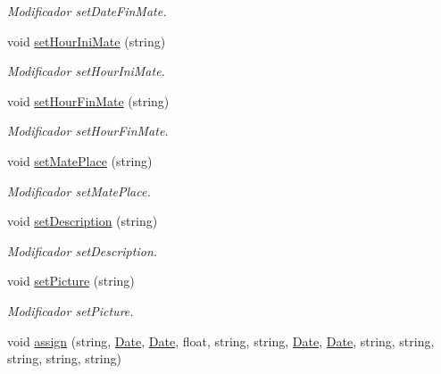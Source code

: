 \begin{DoxyCompactItemize}
\begin{DoxyCompactList}\small\item\em Modificador set\+Date\+Fin\+Mate. \end{DoxyCompactList}\item 
void \hyperlink{class_event_afcfecbce4f34e3bbc8c5b9b1143015f5}{set\+Hour\+Ini\+Mate} (string)\hypertarget{class_event_afcfecbce4f34e3bbc8c5b9b1143015f5}{}\label{class_event_afcfecbce4f34e3bbc8c5b9b1143015f5}

\begin{DoxyCompactList}\small\item\em Modificador set\+Hour\+Ini\+Mate. \end{DoxyCompactList}\item 
void \hyperlink{class_event_ad7e81513dcb7b9fddb7f670171b0402c}{set\+Hour\+Fin\+Mate} (string)\hypertarget{class_event_ad7e81513dcb7b9fddb7f670171b0402c}{}\label{class_event_ad7e81513dcb7b9fddb7f670171b0402c}

\begin{DoxyCompactList}\small\item\em Modificador set\+Hour\+Fin\+Mate. \end{DoxyCompactList}\item 
void \hyperlink{class_event_ac2df54c72bf6a913ef8cea23f9164561}{set\+Mate\+Place} (string)\hypertarget{class_event_ac2df54c72bf6a913ef8cea23f9164561}{}\label{class_event_ac2df54c72bf6a913ef8cea23f9164561}

\begin{DoxyCompactList}\small\item\em Modificador set\+Mate\+Place. \end{DoxyCompactList}\item 
void \hyperlink{class_event_a10101412d581dc0a23e6bde775e8330b}{set\+Description} (string)\hypertarget{class_event_a10101412d581dc0a23e6bde775e8330b}{}\label{class_event_a10101412d581dc0a23e6bde775e8330b}

\begin{DoxyCompactList}\small\item\em Modificador set\+Description. \end{DoxyCompactList}\item 
void \hyperlink{class_event_a6ebd602ac071857bc3603713f372af16}{set\+Picture} (string)\hypertarget{class_event_a6ebd602ac071857bc3603713f372af16}{}\label{class_event_a6ebd602ac071857bc3603713f372af16}

\begin{DoxyCompactList}\small\item\em Modificador set\+Picture. \end{DoxyCompactList}\item 
void \hyperlink{class_event_a114abce3ab2a010cdd29eb6765ddc148}{assign} (string, \hyperlink{class_date}{Date}, \hyperlink{class_date}{Date}, float, string, string, \hyperlink{class_date}{Date}, \hyperlink{class_date}{Date}, string, string, string, string, string)\hypertarget{class_event_a114abce3ab2a010cdd29eb6765ddc148}{}\label{class_event_a114abce3ab2a010cdd29eb6765ddc148}


\end{DoxyCompactItemize}
